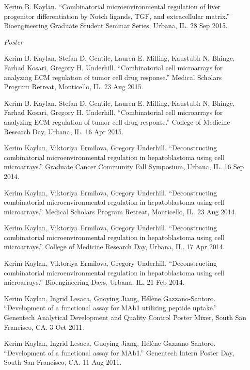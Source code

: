 \documentclass[11pt,article,oneside]{memoir}
\begin{document}
\ind Kerim B. Kaylan. ``Combinatorial microenvironmental regulation of liver progenitor differentiation by Notch ligands, TGF\textbeta, and extracellular matrix.'' Bioengineering Graduate Student Seminar Series, Urbana, IL. 28 Sep 2015.

\bigskip

\noindent\emph{Poster\vspace{0.05in}}

\ind Kerim B. Kaylan, Stefan D. Gentile, Lauren E. Milling, Kaustubh N. Bhinge, Farhad Kosari, Gregory H. Underhill. ``Combinatorial cell microarrays for analyzing ECM regulation of tumor cell drug response.'' Medical Scholars Program Retreat, Monticello, IL. 23 Aug 2015.

\ind Kerim B. Kaylan, Stefan D. Gentile, Lauren E. Milling, Kaustubh N. Bhinge, Farhad Kosari, Gregory H. Underhill. ``Combinatorial cell microarrays for analyzing ECM regulation of tumor cell drug response.'' College of Medicine Research Day, Urbana, IL. 16 Apr 2015.

\ind Kerim Kaylan, Viktoriya Ermilova, Gregory Underhill. ``Deconstructing combinatorial microenvironmental regulation in hepatoblastoma using cell microarrays.'' Graduate Cancer Community Fall Symposium, Urbana, IL. 16 Sep 2014.

\ind Kerim Kaylan, Viktoriya Ermilova, Gregory Underhill. ``Deconstructing combinatorial microenvironmental regulation in hepatoblastoma using cell microarrays.'' Medical Scholars Program Retreat, Monticello, IL. 23 Aug 2014.

\ind Kerim Kaylan, Viktoriya Ermilova, Gregory Underhill. ``Deconstructing combinatorial microenvironmental regulation in hepatoblastoma using cell microarrays.'' College of Medicine Research Day, Urbana, IL. 17 Apr 2014.

\ind Kerim Kaylan, Viktoriya Ermilova, Gregory Underhill. ``Deconstructing combinatorial microenvironmental regulation in hepatoblastoma using cell microarrays.'' Bioengineering Days, Urbana, IL. 21 Feb 2014.

\ind Kerim Kaylan, Ingrid Lesaca, Guoying Jiang, H\'el\`ene Gazzano-Santoro. ``Development of a functional assay for MAb1 utilizing peptide uptake.'' Genentech Analytical Development and Quality Control Poster Mixer, South San Francisco, CA. 3 Oct 2011.

\ind Kerim Kaylan, Ingrid Lesaca, Guoying Jiang, H\'el\`ene Gazzano-Santoro. ``Development of a functional assay for MAb1.'' Genentech Intern Poster Day, South San Francisco, CA. 11 Aug 2011.
\end{document}
